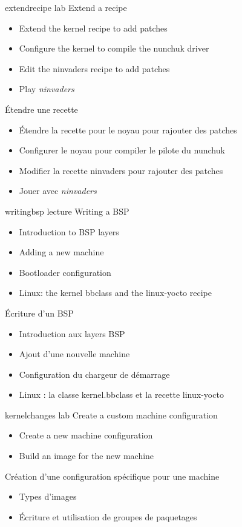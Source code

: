 {extendrecipe}
{lab}
{Extend a recipe}
{
  \begin{itemize}
  \item Extend the kernel recipe to add patches
  \item Configure the kernel to compile the nunchuk driver
  \item Edit the ninvaders recipe to add patches
  \item Play {\em ninvaders}
  \end{itemize}
}
{Étendre une recette}
{
  \begin{itemize}
  \item Étendre la recette pour le noyau pour rajouter des patches
  \item Configurer le noyau pour compiler le pilote du nunchuk
  \item Modifier la recette ninvaders pour rajouter des patches
  \item Jouer avec {\em ninvaders}
  \end{itemize}
}

{writingbsp}
{lecture}
{Writing a BSP}
{
  \begin{itemize}
  \item Introduction to BSP layers
  \item Adding a new machine
  \item Bootloader configuration
  \item Linux: the kernel bbclass and the linux-yocto recipe
  \end{itemize}
}
{Écriture d'un BSP}
{
  \begin{itemize}
  \item Introduction aux layers BSP
  \item Ajout d'une nouvelle machine
  \item Configuration du chargeur de démarrage
  \item Linux : la classe kernel.bbclass et la recette linux-yocto
  \end{itemize}
}

{kernelchanges}
{lab}
{Create a custom machine configuration}
{
  \begin{itemize}
  \item Create a new machine configuration
  \item Build an image for the new machine
  \end{itemize}
}
{Création d'une configuration spécifique pour une machine}
{
  \begin{itemize}
  \item Types d'images
  \item Écriture et utilisation de groupes de paquetages
  \end{itemize}
}


